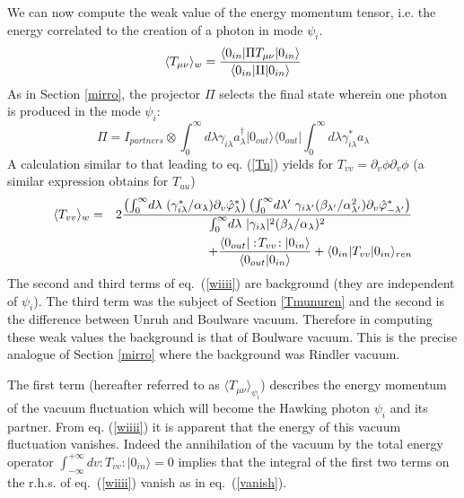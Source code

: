 \documentclass[12pt,oneside]{report}
\def\ket#1{|#1\rangle}
\def\bra#1{\langle #1|}
\def\la{\lambda}
\def\beq {\begin{equation}}
\def\feq {\end{equation}}
\def\beqa {\begin{eqnarray}}
\def\feqa {\end{eqnarray}}
\def\p {\prime}
\begin{document}
We can now compute the weak value of the energy momentum tensor, i.e. 
the energy correlated
to the creation of a photon in mode $\psi_i$.  \begin{equation}
\langle T_{\mu\nu}\rangle_w ={  \bra{0_{in}}\Pi T_{\mu\nu} \ket{0_{in}}
\over \bra{0_{in}}\Pi  \ket{0_{in}} }
\label{wii}
\end{equation}
As in Section \ref{mirro}, the projector $\Pi$ selects the
final state wherein one photon is produced in the mode $\psi_i$:
\beq
\Pi = I_{partners}\otimes
\int_0^\infty \!d\la \gamma_{i\la}a_\la^\dagger \ket{0_{out}}
\bra{0_{out}} \int_0^\infty \!d\la \gamma_{i\la}^* a_\la
\label{wiii}\feq
A calculation similar to that leading to eq. (\ref{Tn}) yields
for $T_{vv}=\partial_v\phi\partial_v \phi$ (a similar expression obtains
for $T_{uu}$) \beqa
\langle T_{vv}\rangle_w
&=& 
2{
\left(\int_0^\infty \! d\la\ 
(\gamma^*_{i\la}/\alpha_\la)  \partial_v \hat\varphi^*_\la\right)\left(
\int_0^\infty \! d\la^\p\ 
\gamma_{i \la^\p} (\beta_{\la^\p} / \alpha_{\la^\p}^2 )
 \partial_v \hat\varphi^*_{-\la^\p}\right)
\over 
\int_0^\infty \! d\la\ 
\vert \gamma_{i\la} \vert^2 ( \beta_\la /\alpha_\la)^2
}
 \nonumber\\ & &+ 
{\bra {0_{out}} :\!T_{vv} \!: \ket{0_{in}} \over \langle
{0_{out}}  \ket{0_{in}}  } 
+\bra {0_{in}} T_{vv} \ket{0_{in}}_{ren}
\label{wiiii}
\feqa
The second and third terms of eq.~(\ref{wiiii}) are background (they are independent of $\psi_i$).
The third term was the subject of Section \ref{Tmunuren} and the second is the difference
between Unruh and Boulware vacuum. Therefore in computing 
these weak values the background is that
of Boulware vacuum. This is the precise analogue of Section \ref{mirro} where the
background was Rindler vacuum. 

The first term (hereafter referred to as $\langle T_{\mu\nu} \rangle
_{\psi_i}$) describes the energy momentum of the vacuum fluctuation which will
become the Hawking photon $\psi_i$ and its partner. From eq. (\ref{wiiii})
it is apparent that the energy of this vacuum fluctuation vanishes.
Indeed the annihilation of the vacuum by the total energy
operator $\int_{-\infty}^{+ \infty} dv :\!T_{vv} \!: \ket{0_{in}} =0$ implies
that the integral of the first two terms on the r.h.s. of eq.~(\ref{wiiii}) 
vanish as in eq.~(\ref{vanish}). 
\end{document}
